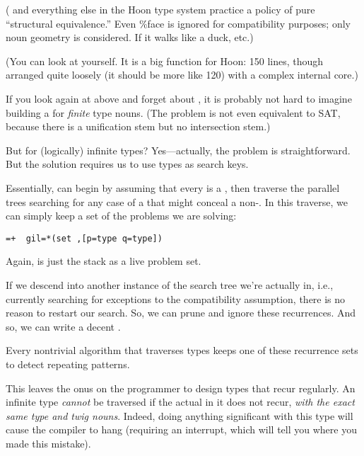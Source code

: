 ( and everything else in the Hoon type system practice a
policy of pure ``structural equivalence.''  Even \%face is ignored
for compatibility purposes; only noun geometry is considered.  If
it walks like a duck, etc.)

(You can look at  yourself.  It is a big function for
Hoon: 150 lines, though arranged quite loosely (it should be 
more like 120) with a complex internal core.)

If you look again at  above and forget about , 
it is probably not hard to imagine building a  for 
\emph{finite} type nouns.  (The problem is not even equivalent to SAT,
because there is a unification stem but no intersection stem.)

But for (logically) infinite types?  Yes---actually, the problem
is straightforward.  But the solution requires us to use 
types as search keys.

Essentially,  can begin by assuming that every  is a
, then traverse the parallel trees searching for any case
of a  that might conceal a non-.  In this traverse, we
can simply keep a set of the  problems we are solving:

\begin{framed_shaded}
\begin{Verbatim}[fontsize=\relsize{-2.5},fontseries=b,commandchars=\\\{\}]
=+  gil=*(set ,[p=type q=type])
\end{Verbatim}
\end{framed_shaded}
Again,  is just the  stack as a live problem set.

If we descend into another instance of the search tree we're
actually in, i.e., currently searching for exceptions to the
compatibility assumption, there is no reason to restart our
search.  So, we can prune and ignore these recurrences.  And
so, we can write a decent .

Every nontrivial algorithm that traverses types keeps one of
these recurrence sets to detect repeating patterns.

This leaves the onus on the programmer to design types that recur
regularly.  An infinite type \emph{cannot} be traversed if the actual
\kode{[\%hold p=type q=twig]} in it does not recur, \emph{with the exact
same type and twig nouns}.  Indeed, doing anything significant
with this type will cause the compiler to hang (requiring an
interrupt, which will tell you where you made this mistake).

